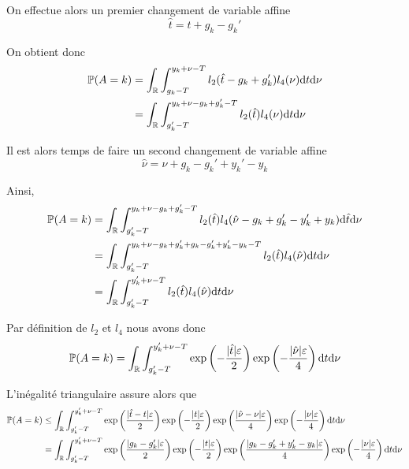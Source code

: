On effectue alors un premier changement de variable affine 
\[
    \hat t = t + g_k - g_k'    
\]

On obtient donc 
\begin{align*}
    \mathbb P(A = k) & = \int_{\mathbb{R}}\int_{g_k- T}^{y_k + \nu - T} l_2(\hat t - g_k + g_k')l_4(\nu) \mathrm{d}  t \mathrm{d} \nu\\
    & = \int_{\mathbb{R}}\int_{g_k' - T}^{y_k + \nu - g_k + g_k' - T} l_2(\hat t )l_4(\nu) \mathrm{d}  t \mathrm{d} \nu\\
\end{align*}

Il est alors temps de faire un second changement de variable affine
\[
    \hat \nu = \nu + g_k - g_k' + y_k' - y_k   
\]

Ainsi,
\begin{align*}
    \mathbb P(A = k) & = \int_{\mathbb{R}}\int_{g_k' - T}^{y_k + \nu - g_k + g_k' - T} l_2(\hat t )l_4(\hat\nu - g_k + g_k' - y_k' + y_k) \mathrm{d} \hat t \mathrm{d} \nu\\
    & = \int_{\mathbb{R}}\int_{g_k' - T}^{y_k + \nu  - g_k +g_k'  + g_k - g_k' +y_k' - y_k - T} l_2(\hat t )l_4(\hat\nu) \mathrm{d}  t \mathrm{d} \nu\\
    & = \int_{\mathbb{R}}\int_{g_k' - T }^{y_k' + \nu - T } l_2(\hat t )l_4(\hat\nu) \mathrm{d} t \mathrm{d} \nu\\
\end{align*}

Par définition de \(l_2\) et \(l_4\) nous avons donc
\begin{align*}
    \mathbb P(A = k) & =  \int_{\mathbb{R}}\int_{g_k' - T}^{y_k' + \nu -T} \exp\left(-\dfrac{|\hat t|\varepsilon}{2}\right)\exp\left(-\dfrac{|\hat\nu|\varepsilon}{4}\right) \mathrm{d} t \mathrm{d} \nu\\
\end{align*}

L'inégalité triangulaire assure alors que 
\begin{align*}
    \mathbb P(A = k) & \leq  \int_{\mathbb{R}}\int_{g_k' - T}^{y_k' + \nu - T } \exp\left(\dfrac{|\hat t - t|\varepsilon}{2}\right)\exp\left(-\dfrac{|t|\varepsilon}{2}\right)\exp\left(\dfrac{|\hat\nu - \nu|\varepsilon}{4}\right)\exp\left(-\dfrac{|\nu|\varepsilon}{4}\right) \mathrm{d} t \mathrm{d} \nu\\
    & =  \int_{\mathbb{R}}\int_{g_k' - T}^{y_k' + \nu -T} \exp\left(\dfrac{| g_k - g_k' |\varepsilon}{2}\right)\exp\left(-\dfrac{|t|\varepsilon}{2}\right)\exp\left(\dfrac{|g_k - g_k' + y_k' - y_k |\varepsilon}{4}\right)\exp\left(-\dfrac{|\nu|\varepsilon}{4}\right) \mathrm{d}  t \mathrm{d} \nu\\
\end{align*}

